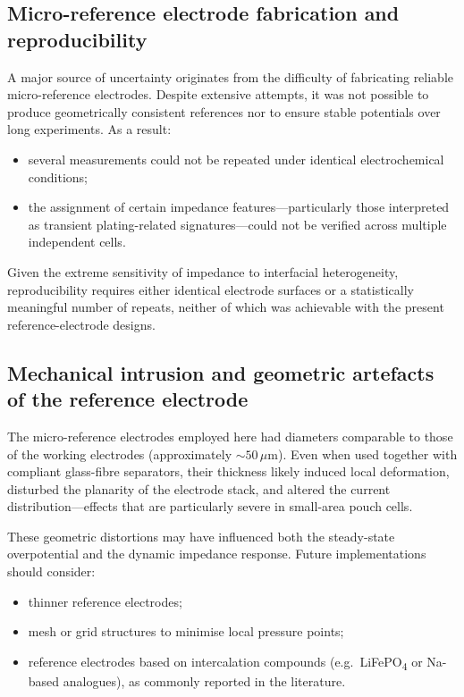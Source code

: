 \subsection{Micro-reference electrode fabrication and reproducibility}

A major source of uncertainty originates from the difficulty of fabricating reliable micro-reference electrodes.  
Despite extensive attempts, it was not possible to produce geometrically consistent references nor to ensure stable potentials over long experiments. 
As a result:

\begin{itemize}
    \item several measurements could not be repeated under identical electrochemical conditions;
    \item the assignment of certain impedance features---particularly those interpreted as transient plating-related signatures---could not be verified across multiple independent cells.
\end{itemize}

Given the extreme sensitivity of impedance to interfacial heterogeneity, reproducibility requires either identical electrode surfaces or a statistically meaningful number of repeats, neither of which was achievable with the present reference-electrode designs.

\subsection{Mechanical intrusion and geometric artefacts of the reference electrode}

The micro-reference electrodes employed here had diameters comparable to those of the working electrodes (approximately $\sim50\,\mu$m). Even when used together with compliant glass-fibre separators, their thickness likely induced local deformation, disturbed the planarity of the electrode stack, and altered the current distribution—effects that are particularly severe in small-area pouch cells.

These geometric distortions may have influenced both the steady-state overpotential and the dynamic impedance response. Future implementations should consider:

\begin{itemize}
    \item thinner reference electrodes;
    \item mesh or grid structures to minimise local pressure points;
    \item reference electrodes based on intercalation compounds (e.g.\ LiFePO\textsubscript{4} or Na-based analogues), as commonly reported in the literature.
\end{itemize}

